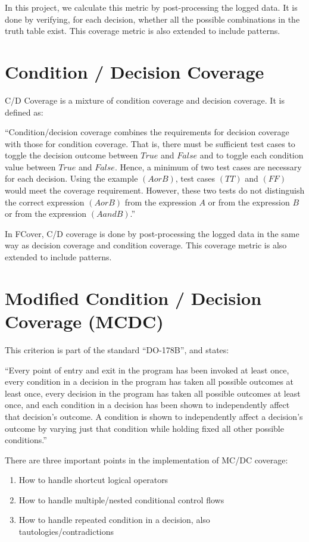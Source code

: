 \documentclass[12pt,a4paper]{report}
\begin{document}
In this project, we calculate this metric by post-processing the logged data. It is done by verifying, for each decision, whether all the possible combinations in the truth table exist. This coverage metric is also extended to include patterns.

\section{Condition / Decision Coverage}
C/D Coverage is a mixture of condition coverage and decision coverage. It is defined as:

``Condition/decision coverage combines the requirements for decision coverage with those for condition coverage. That is, there must be sufficient test cases to toggle the decision outcome between $True$ and $False$ and to toggle each condition value between $True$ and $False$. Hence, a minimum of two test cases are necessary for each decision. Using the example $(A or B)$, test cases $(TT)$ and $(FF)$ would meet the coverage requirement. However, these two tests do not distinguish the correct expression $(A or B)$ from the expression $A$ or from the expression $B$ or from the expression $(A and B)$.''\cite{KellyJ.:2001:PTM:886632} 

In FCover, C/D coverage is done by post-processing the logged data in the same way as decision coverage and condition coverage. This coverage metric is also extended to include patterns.

\section{Modified Condition / Decision Coverage (MCDC)}
This criterion is part of the standard ``DO-178B'', and states:

``Every point of entry and exit in the program has been invoked at least once, every condition in a decision in the program has taken all possible outcomes at least once, every decision in the program has taken all possible outcomes at least once, and each condition in a decision has been shown to independently affect that decision's outcome. A condition is shown to independently affect a decision's outcome by varying just that condition while holding fixed all other possible conditions.''\cite{cast-10}

There are three important points in the implementation of MC/DC coverage:

\begin{enumerate}
 \item How to handle shortcut logical operators
 \item How to handle multiple/nested conditional control flows
 \item How to handle repeated condition in a decision, also tautologies/contradictions
\end{enumerate}
 
\end{document}
